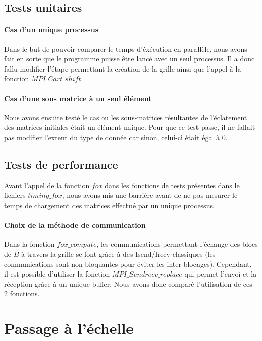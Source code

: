 \documentclass[12pt]{article}
\begin{document}
\subsection{Tests unitaires}
\paragraph{Cas d'un unique processus}
Dans le but de pouvoir comparer le temps d'éxécution en parallèle, nous avons fait en sorte que le programme puisse être lancé avec un seul processus. Il a donc fallu modifier l'étape permettant la création de la grille ainsi que l'appel à la fonction $MPI\_Cart\_shift$.

\paragraph{Cas d'une sous matrice à un seul élément}
Nous avons ensuite testé le cas ou les sous-matrices résultantes de l'éclatement des matrices initiales était un élément unique. Pour que ce test passe, il ne fallait pas modifier l'extent du type de donnée car sinon, celui-ci était égal à $0$.

\subsection{Tests de performance}
Avant l'appel de la fonction $fox$ dans les fonctions de tests présentes dans le fichiers $timing\_fox$, nous avons mis une barrière avant de ne pas mesurer le temps de chargement des matrices effectué par un unique processus.

\paragraph{Choix de la méthode de communication}
Dans la fonction $fox\_compute$, les communications permettant l'échange des blocs de $B$ à travers la grille se font grâce à des Isend/Irecv classiques (les communications sont non-bloquantes pour éviter les inter-blocages). Cependant, il est possible d'utiliser la fonction $MPI\_Sendrecv\_replace$ qui permet l'envoi et la réception grâce à un unique buffer. Nous avons donc comparé l'utilisation de ces 2 fonctions.


\section{Passage à l'échelle}
\end{document}
